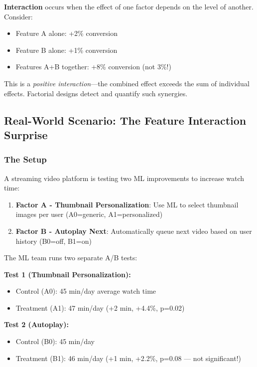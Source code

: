 \textbf{Interaction} occurs when the effect of one factor depends on the level of another. Consider:
\begin{itemize}
    \item Feature A alone: +2\% conversion
    \item Feature B alone: +1\% conversion
    \item Features A+B together: +8\% conversion (not 3\%!)
\end{itemize}

This is a \textit{positive interaction}---the combined effect exceeds the sum of individual effects. Factorial designs detect and quantify such synergies.

\subsection{Real-World Scenario: The Feature Interaction Surprise}

\subsubsection{The Setup}

A streaming video platform is testing two ML improvements to increase watch time:

\begin{enumerate}
    \item \textbf{Factor A - Thumbnail Personalization}: Use ML to select thumbnail images per user (A0=generic, A1=personalized)
    \item \textbf{Factor B - Autoplay Next}: Automatically queue next video based on user history (B0=off, B1=on)
\end{enumerate}

The ML team runs two separate A/B tests:

\textbf{Test 1 (Thumbnail Personalization):}
\begin{itemize}
    \item Control (A0): 45 min/day average watch time
    \item Treatment (A1): 47 min/day (+2 min, +4.4\%, p=0.02)
\end{itemize}

\textbf{Test 2 (Autoplay):}
\begin{itemize}
    \item Control (B0): 45 min/day
    \item Treatment (B1): 46 min/day (+1 min, +2.2\%, p=0.08 --- not significant!)
\end{itemize}

